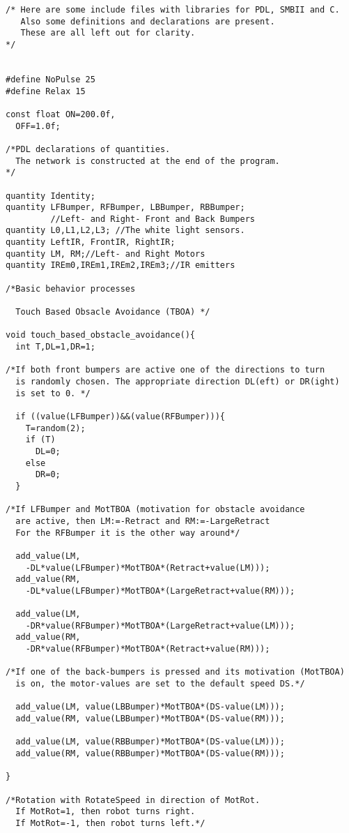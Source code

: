 \begin{lstlisting}
/* Here are some include files with libraries for PDL, SMBII and C.
   Also some definitions and declarations are present.
   These are all left out for clarity.
*/


#define NoPulse 25
#define Relax 15

const float ON=200.0f,
  OFF=1.0f;

/*PDL declarations of quantities. 
  The network is constructed at the end of the program.
*/

quantity Identity;
quantity LFBumper, RFBumper, LBBumper, RBBumper;
         //Left- and Right- Front and Back Bumpers
quantity L0,L1,L2,L3; //The white light sensors.
quantity LeftIR, FrontIR, RightIR;
quantity LM, RM;//Left- and Right Motors
quantity IREm0,IREm1,IREm2,IREm3;//IR emitters

/*Basic behavior processes

  Touch Based Obsacle Avoidance (TBOA) */

void touch_based_obstacle_avoidance(){
  int T,DL=1,DR=1;	
  
/*If both front bumpers are active one of the directions to turn
  is randomly chosen. The appropriate direction DL(eft) or DR(ight)
  is set to 0. */

  if ((value(LFBumper))&&(value(RFBumper))){
    T=random(2);
    if (T)
      DL=0;
    else
      DR=0;
  }

/*If LFBumper and MotTBOA (motivation for obstacle avoidance
  are active, then LM:=-Retract and RM:=-LargeRetract
  For the RFBumper it is the other way around*/

  add_value(LM, 
    -DL*value(LFBumper)*MotTBOA*(Retract+value(LM)));
  add_value(RM, 
    -DL*value(LFBumper)*MotTBOA*(LargeRetract+value(RM)));

  add_value(LM, 
    -DR*value(RFBumper)*MotTBOA*(LargeRetract+value(LM)));
  add_value(RM, 
    -DR*value(RFBumper)*MotTBOA*(Retract+value(RM)));
  
/*If one of the back-bumpers is pressed and its motivation (MotTBOA) 
  is on, the motor-values are set to the default speed DS.*/

  add_value(LM, value(LBBumper)*MotTBOA*(DS-value(LM)));
  add_value(RM, value(LBBumper)*MotTBOA*(DS-value(RM)));

  add_value(LM, value(RBBumper)*MotTBOA*(DS-value(LM)));
  add_value(RM, value(RBBumper)*MotTBOA*(DS-value(RM)));

}

/*Rotation with RotateSpeed in direction of MotRot.
  If MotRot=1, then robot turns right. 
  If MotRot=-1, then robot turns left.*/


\end{lstlisting}
